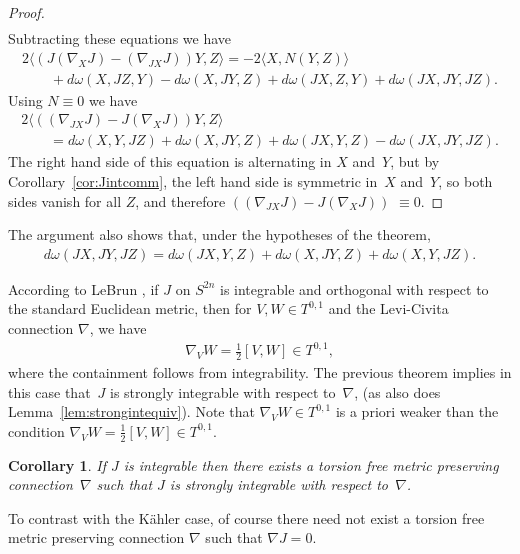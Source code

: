 \documentclass[pdftex]{sigma}
\newtheorem{cor}[thm]{Corollary}
\numberwithin{equation}{section}
\begin{document}
\begin{proof}
\begin{gather*}
\end{gather*}
Subtracting these equations we have
\begin{gather*}
2\langle ( J ( \nabla_X J ) -( \nabla_{JX} J ) ) Y , Z \rangle= -2 \langle X, N(Y,Z) \rangle\\
\qquad{} + d \omega (X,JZ,Y) - d \omega (X,JY,Z) + d \omega (JX,Z,Y) + d \omega (JX,JY,JZ).
\end{gather*}
Using $N \equiv 0$ we have
\begin{gather*}
2\langle ( ( \nabla_{JX} J ) - J ( \nabla_X J ) ) Y , Z \rangle\\
\qquad{} = d \omega (X,Y, JZ) + d \omega (X,JY,Z) + d \omega (JX,Y,Z) - d \omega (JX,JY,JZ).
\end{gather*}
The right hand side of this equation is alternating in $X$ and~$Y$, but by Corollary~\ref{cor:Jintcomm}, the left hand side is symmetric in~$X$ and~$Y$, so both sides vanish for all $Z$, and therefore $ ( ( \nabla_{JX} J ) - J ( \nabla_X J ) )$ $\equiv 0$.
\end{proof}

The argument also shows that, under the hypotheses of the theorem,
\begin{gather*}
d \omega (JX,JY,JZ) = d \omega (JX,Y,Z) + d \omega (X,JY,Z) + d \omega (X,Y, JZ).
\end{gather*}

\begin{rmk} \label{rmk;orthversusstrong}
According to LeBrun \cite{L}, if $J$ on $S^{2n}$ is integrable and orthogonal with respect to the standard Euclidean metric, then for $V,W \in T^{0,1}$ and the Levi-Civita connection $\nabla$, we have
\begin{gather*}
\nabla_V W = \frac 1 2 [V,W] \in T^{0,1},
\end{gather*}
where the containment follows from integrability. The previous theorem implies in this case that~$J$ is strongly integrable with respect to~$\nabla$, (as also does Lemma~\ref{lem:strongintequiv}). Note that $\nabla_V W \in T^{0,1}$ is a priori weaker than the condition $\nabla_V W = \frac 1 2 [V,W] \in T^{0,1}$.
 \end{rmk}

\begin{cor}If $J$ is integrable then there exists a torsion free metric preserving connection~$\nabla$ such that $J$ is strongly integrable with respect to~$\nabla$.
\end{cor}

To contrast with the K\"ahler case, of course there need not exist a torsion free metric preserving connection $\nabla$ such that $\nabla J = 0$.
\end{document}
